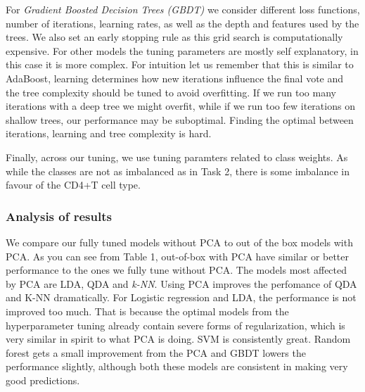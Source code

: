 \documentclass{article}
\begin{document}
For \textit{Gradient Boosted Decision Trees (GBDT)} we consider different loss functions, number of iterations, learning rates, as well as the depth and features used by the trees. 
We also set an early stopping rule as this grid search is computationally expensive.
For other models the tuning parameters are mostly self explanatory, in this case it is more complex.
For intuition let us remember that this is similar to AdaBoost, learning determines how new iterations influence the final vote and the tree complexity should be tuned to avoid overfitting.
If we run too many iterations with a deep tree we might overfit, while if we run too few iterations on shallow trees, our performance may be suboptimal.
Finding the optimal between iterations, learning and tree complexity is hard.

Finally, across our tuning, we  use tuning paramters related to class weights. As while the classes are not as imbalanced as in Task 2, there is some imbalance in favour of the CD4+T cell type.
    


\subsubsection*{Analysis of results}

We compare our fully tuned models without PCA to out of the box models with PCA. As you can see from Table 1,
out-of-box with PCA have similar or better performance to the ones we fully tune without PCA.
The models most affected by PCA are LDA, QDA and \textit{k-NN}. Using PCA improves the perfomance of QDA and K-NN dramatically. 
For Logistic regression and LDA, the performance is not improved too much. That is because the optimal models from the hyperparameter tuning already contain severe forms of regularization,
which is very similar in spirit to what PCA is doing. SVM is consistently great. Random forest gets a small improvement from the PCA and GBDT lowers the performance slightly,
although both these models are consistent in making very good predictions.
\end{document}
